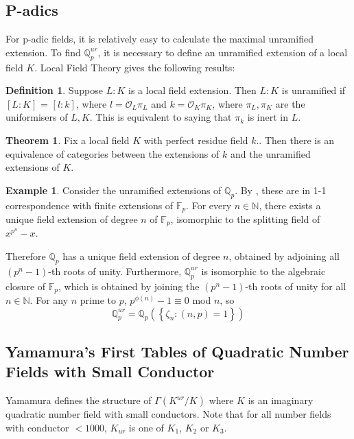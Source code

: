 \documentclass[12pt]{extarticle}
\newcommand{\N}{\mathbb{N}}
\newcommand{\F}{\mathbb{F}}
\newcommand{\Q}{\mathbb{Q}}
\newcommand{\co}{\mathcal{O}}
\newcommand{\<}{\langle}
\renewcommand{\>}{\rangle}
\theoremstyle{definition}
\newtheorem{theorem}{Theorem}
\newtheorem*{definition}{Definition}
\newtheorem{example}{Example}
\begin{document}
\subsection{P-adics}
For p-adic fields, it is relatively easy to calculate the maximal unramified extension. 
To find $\Q_p^{ur}$, it is necessary to define an unramified extension of a local field $K$. Local Field Theory gives the following results:
\begin{definition}
Suppose $L:K$ is a local field extension. Then $L:K$ is unramified if $[L:K]$ = $[l:k]$, where $l = \co_L\pi_L$ and $ k= \co_K\pi_K$, where $\pi_L,\pi_K$ are the uniformisers of $L,K$. This is equivalent to saying that $\pi_k$ is inert in $L$. 
\end{definition}
\begin{theorem}
\label{thm:res}
Fix a local field $K$ with perfect residue field $k$.. Then there is an equivalence of categories
between the extensions of $k$ and the unramified extensions of $K$. 
\end{theorem}
\begin{example}
Consider the unramified extensions of $\Q_p$. By , these are in 1-1 correspondence with finite extensions of $\F_p$. For every $n \in \N$, there exists a unique field extension of degree $n$ of $\F_p$, isomorphic to the splitting field of $x^{p^n}-x$. \par Therefore $\Q_p$ has a unique field extension of degree $n$, obtained by adjoining all $\left( p^n-1\right)$-th roots of unity. Furthermore,
$\Q_p^{ur}$ is isomorphic to the algebraic closure of $\F_p$, which is obtained by joining the $\left( p^n-1\right)$-th roots of unity for all $n \in \N$. For any $n$ prime to $p$, $p^{\phi(n)}-1 \equiv 0$ mod $n$, so 
\begin{equation}
\Q_p^{ur} = \Q_p(\left\{ \zeta_n: (n,p)=1 \right\})
\end{equation}
\end{example}
\subsection{Yamamura's First Tables of Quadratic Number Fields with Small Conductor}
Yamamura \cite{YAMA1997} defines the structure of $\Gamma(K^{ur}/K)$ where $K$ is an imaginary quadratic number field with small conductors. Note that for all number fields with conductor $<1000$, $K_{ur}$ is one of $K_1$, $K_2$ or $K_3$. \par 
\end{document}

